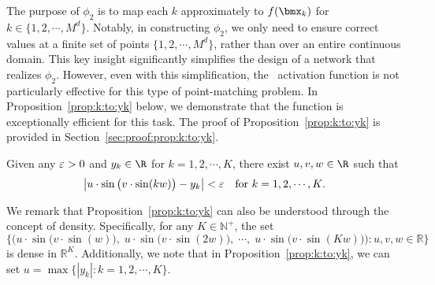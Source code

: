 \documentclass[11pt,a4paper]{article}
\begin{document}

The purpose of $\phi_2$ is to map each $k$ approximately to $f(\bmx_k)$ for $k \in \{1, 2, \cdots, M^d\}$. Notably, in constructing $\phi_2$, we only need to ensure correct values at a finite set of points $\{1, 2, \cdots, M^d\}$, rather than over an entire continuous domain. This key insight significantly simplifies the design of a network that realizes $\phi_2$.
However, even with this simplification, the \ReLU\ activation function is not particularly effective for this type of point-matching problem. In Proposition~\ref{prop:k:to:yk} below, we demonstrate that the \sine{}  function is exceptionally efficient for this task. The proof of Proposition~\ref{prop:k:to:yk} is provided in Section~\ref{sec:proof:prop:k:to:yk}.




\begin{proposition}
    \label{prop:k:to:yk}
    Given any  $\varepsilon>0$ and $y_k\in \R$ for $k=1,2,\cdots,K$, there exist $u ,v ,w \in\R$ such that
    \begin{equation*}
        \big|u \cdot \sin\big(v  \cdot \sin(kw )\big)-y_k\big|<\varepsilon \quad \textnormal{for $k=1,2,\mathinner{\mkern-0.1mu\cdotp\mkern-0.3mu\cdotp\mkern-0.3mu\cdotp\mkern-0.1mu},K$.}
    \end{equation*}
\end{proposition}

We remark that Proposition~\ref{prop:k:to:yk} can also be understood through the concept of density. Specifically, for any \( K \in \mathbb{N}^+ \), the set
\begin{equation*}
    \Bigg\{\bigg(u \cdot \sin\big(v \cdot \sin(w)\big),\; u \cdot \sin\big(v \cdot \sin(2w)\big),\; \cdots,\; u \cdot \sin\big(v \cdot \sin(Kw)\big)\bigg) : u, v, w \in \mathbb{R} \Bigg\}
\end{equation*}
is dense in \( \mathbb{R}^K \). Additionally, we note that in Proposition~\ref{prop:k:to:yk}, we can set \( u = \max\{|y_k| : k = 1, 2, \cdots, K\} \).
\end{document}

